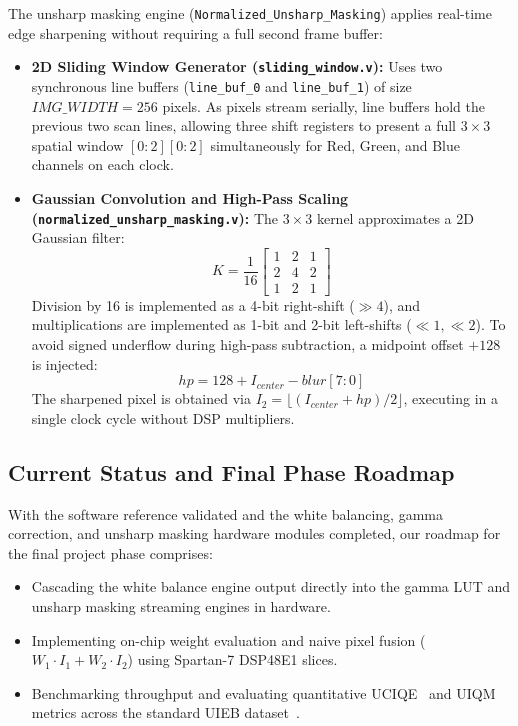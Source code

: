 \documentclass[10pt,twocolumn,letterpaper]{article}
\begin{document}
{The unsharp masking engine (\texttt{Normalized\_Unsharp\_Masking}) applies real-time edge sharpening without requiring a full second frame buffer:
\begin{itemize}
    \item \textbf{2D Sliding Window Generator (\texttt{sliding\_window.v}):} Uses two synchronous line buffers (\texttt{line\_buf\_0} and \texttt{line\_buf\_1}) of size $IMG\_WIDTH = 256$ pixels. As pixels stream serially, line buffers hold the previous two scan lines, allowing three shift registers to present a full $3\times3$ spatial window $[0:2][0:2]$ simultaneously for Red, Green, and Blue channels on each clock.
    \item \textbf{Gaussian Convolution and High-Pass Scaling (\texttt{normalized\_unsharp\_masking.v}):} The $3\times3$ kernel approximates a 2D Gaussian filter:
    \begin{equation}
      K = \frac{1}{16} \begin{bmatrix} 1 & 2 & 1 \\ 2 & 4 & 2 \\ 1 & 2 & 1 \end{bmatrix}
    \end{equation}
    Division by 16 is implemented as a 4-bit right-shift ($\gg 4$), and multiplications are implemented as 1-bit and 2-bit left-shifts ($\ll 1, \ll 2$).
    To avoid signed underflow during high-pass subtraction, a midpoint offset $+128$ is injected:
    \begin{equation}
      hp = 128 + I_{center} - blur[7:0]
    \end{equation}
    The sharpened pixel is obtained via $I_2 = \lfloor(I_{center} + hp) / 2\rfloor$, executing in a single clock cycle without DSP multipliers.
\end{itemize}

\subsection{Current Status and Final Phase Roadmap}
\label{subsec:roadmap_cont}

With the software reference validated and the white balancing, gamma correction, and unsharp masking hardware modules completed, our roadmap for the final project phase comprises:
\begin{itemize}
    \item Cascading the white balance engine output directly into the gamma LUT and unsharp masking streaming engines in hardware.
    \item Implementing on-chip weight evaluation and naive pixel fusion ($W_1 \cdot I_1 + W_2 \cdot I_2$) using Spartan-7 DSP48E1 slices.
    \item Benchmarking throughput and evaluating quantitative UCIQE~\cite{yang2015uciqe} and UIQM~\cite{panetta2016uiqm} metrics across the standard UIEB dataset~\cite{li2020underwater}.
\end{itemize}

} %

\FloatBarrier

{\small


}
\end{document}
